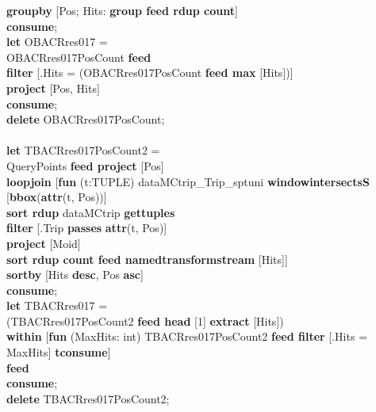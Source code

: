 \documentclass[a4paper]{article}
\newcommand{\op}[1]{\textbf{#1}}
\begin{document}
\begin{scriptsize}
\begin{tabbing}
\>\op{groupby} [Pos; Hits: \op{group feed rdup count}]\\
\op{consume};\\
\op{let} OBACRres017 =\\
\>OBACRres017PosCount \op{feed}\\
\>\op{filter} [.Hits = (OBACRres017PosCount \op{feed max} [Hits])]\\
\>\op{project} [Pos, Hits]\\
\op{consume};\\
\op{delete} OBACRres017PosCount;\\
\\
\op{let} TBACRres017PosCount2 =\\
\>QueryPoints \op{feed project} [Pos]\\
\>\op{loopjoin} [\op{fun} (t:TUPLE) dataMCtrip\_Trip\_sptuni \op{windowintersectsS} [\op{bbox}(\op{attr}(t, Pos))]\\
\>\>\op{sort rdup} dataMCtrip \op{gettuples}\\
\>\>\op{filter} [.Trip \op{passes} \op{attr}(t, Pos)]\\
\>\>\op{project} [Moid]\\
\>\>\op{sort rdup count feed namedtransformstream} [Hits]]\\
\>\op{sortby} [Hits \op{desc}, Pos \op{asc}]\\
\op{consume};\\
\op{let} TBACRres017 =\\
\>(TBACRres017PosCount2 \op{feed head} [1] \op{extract} [Hits])\\
\>\>\op{within} [\op{fun} (MaxHits: int) TBACRres017PosCount2 \op{feed filter} [.Hits = MaxHits] \op{tconsume}]\\
\>\op{feed}\\
\op{consume};\\
\op{delete} TBACRres017PosCount2;\\
\end{tabbing}
\end{scriptsize}
\end{document}
